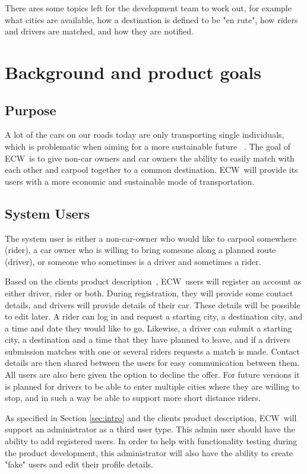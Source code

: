 \documentclass{article}
\newcommand{\name}{ECW\ }
\begin{document}
There ares some topics left for the development team to work out, for example what cities are available, how a destination is defined to be "en rute", how riders and drivers are matched, and how they are notified.

\section{Background and product goals}
\subsection{Purpose}
A lot of the cars on our roads today are only transporting single individuals, which is problematic when aiming for a more sustainable future ~\cite{BNL}. The goal of \name is to give non-car owners and car owners the ability to easily match with each other and carpool together to a common destination. \name will provide its users with a more economic and sustainable mode of transportation.

\subsection{System Users}
The system user is either a non-car-owner who would like to carpool somewhere (rider), a car owner who is willing to bring someone along a planned route (driver), or someone who sometimes is a driver and sometimes a rider.

Based on the clients product description~\cite{PH}, \name users will register an account as either driver, rider or both. During registration, they will provide some contact details, and drivers will provide details of their car. These details will be possible to edit later. A rider can log in and request a starting city, a destination city, and a time and date they would like to go. Likewise, a driver can submit a starting city, a destination and a time that they have planned to leave, and if a drivers submission matches with one or several riders requests a match is made. Contact details are then shared between the users for easy communication between them. All users are also here given the option to decline the offer. For future versions it is planned for drivers to be able to enter multiple cities where they are willing to stop, and in such a way be able to support more short distance riders.

As specified in Section \ref{sec:intro} and the clients product description\cite{PH}, \name will support an administrator as a third user type. This admin user should have the ability to add registered users. In order to help with functionality testing during the product development, this administrator will also have the ability to create "fake" users and edit their profile details.
\end{document}
